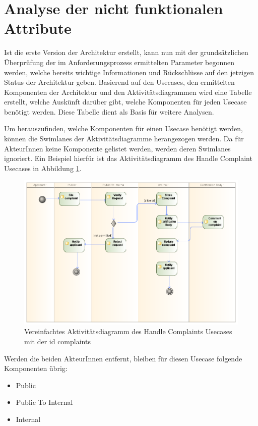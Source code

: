 \section{Analyse der nicht funktionalen Attribute}
Ist die erste Version der Architektur erstellt, kann nun mit der grundsätzlichen Überprüfung der im Anforderungsprozess ermittelten Parameter begonnen werden, welche bereits wichtige Informationen und Rückschlüsse auf den jetzigen Status der Architektur geben. Basierend auf den Usecases, den ermittelten Komponenten der Architektur und den Aktivitätsdiagrammen wird eine Tabelle erstellt, welche Auskünft darüber gibt, welche Komponenten für jeden Usecase benötigt werden. Diese Tabelle dient als Basis für weitere Analysen.

Um herauszufinden, welche Komponenten für einen Usecase benötigt werden, können die Swimlanes der Aktivitätsdiagramme herangezogen werden. Da für AkteurInnen keine Komponente gelistet werden, werden deren Swimlanes ignoriert. Ein Beispiel hierfür ist das Aktivitätsdiagramm des Handle Complaint Usecases in Abbildung \ref{fig:handlecomplaintreview}.

\begin{figure}[H]
    \centering
    \includegraphics[scale=0.5]{uml/handlecomplaintsactivityreview.png}
    \caption{Vereinfachtes Aktivitätsdiagramm des Handle Complaints Usecases mit der id complaints}
    \label{fig:handlecomplaintreview}
\end{figure}

Werden die beiden AkteurInnen entfernt, bleiben für diesen Usecase folgende Komponenten übrig:

\begin{itemize}
  \item Public
  \item Public To Internal
  \item Internal
\end{itemize}


